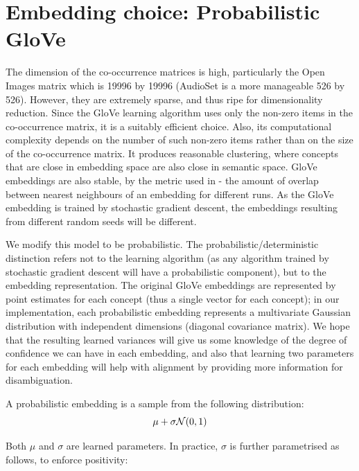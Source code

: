 \section{Embedding choice: Probabilistic GloVe}

The dimension of the co-occurrence matrices is high, particularly the Open Images matrix which is 19996 by 19996 (AudioSet is a more manageable 526 by 526). However, they are extremely sparse, and thus ripe for dimensionality reduction. Since the  GloVe learning algorithm uses only the non-zero items in the co-occurrence matrix, it is a suitably efficient choice. Also, its computational complexity depends on the number of such non-zero items rather than on the size of the co-occurrence matrix. It produces reasonable clustering, where concepts that are close in embedding space are also close in semantic space. %
GloVe embeddings are also stable, by the metric used in \cite{WordEmbeddingStability}- the amount of overlap between nearest neighbours of an embedding for different runs. As the GloVe embedding is trained by stochastic gradient descent, the embeddings resulting from different random seeds will be different.

We modify this model to be probabilistic.  The probabilistic/deterministic distinction refers not to the learning algorithm (as any algorithm trained by stochastic gradient descent will have a probabilistic component), but to the embedding representation. The original GloVe embeddings are represented by point estimates for each concept (thus a single vector for each concept); in our implementation, each probabilistic embedding represents a multivariate Gaussian distribution with independent dimensions (diagonal covariance matrix). We hope that the resulting learned variances will give us some knowledge of the degree of confidence we can have in each embedding, and also that learning two parameters for each embedding will help with alignment by providing more information for disambiguation. 

A probabilistic embedding is a sample from the following distribution:
\begin{equation*}
    \mu + \sigma \mathcal{N}(0, 1)
\end{equation*}

Both $\mu$ and $\sigma$ are learned parameters. In practice, $\sigma$ is further parametrised as follows, to enforce positivity:

